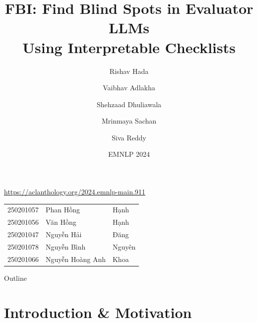 \documentclass[aspectratio=169,10pt]{beamer}
\title[\fbi{} — EMNLP 2024]%
      {FBI: Find Blind Spots in Evaluator LLMs\\Using Interpretable Checklists}
\author[Hada et al., EMNLP 2024]{Rishav Hada \and Vaibhav Adlakha \and Shehzaad Dhuliawala \\
        \and Mrinmaya Sachan \and Siva Reddy}
\institute{McGill / Mila \quad ETH Zürich}
\date{EMNLP 2024}
\newcommand{\vn}[1]{{\fontencoding{T5}\selectfont #1}}
\begin{document}

\begin{frame}
  \titlepage
  \vspace{-0.8em}
  \begin{center}
    \small\url{https://aclanthology.org/2024.emnlp-main.911}

    \vspace{0.6em}
    \small
    \begin{tabular}{cll}
      250201057 & \vn{Phan Hồng}        & \vn{Hạnh}   \\
      250201056 & \vn{Văn Hồng}         & \vn{Hạnh}   \\
      250201047 & \vn{Nguyễn Hải}       & \vn{Đăng}   \\
      250201078 & \vn{Nguyễn Bình}      & \vn{Nguyên} \\
      250201066 & \vn{Nguyễn Hoàng Anh} & Khoa        \\
    \end{tabular}
  \end{center}
\end{frame}

\begin{frame}{Outline}
  \tableofcontents
\end{frame}

\section{Introduction \& Motivation}
\end{document}
